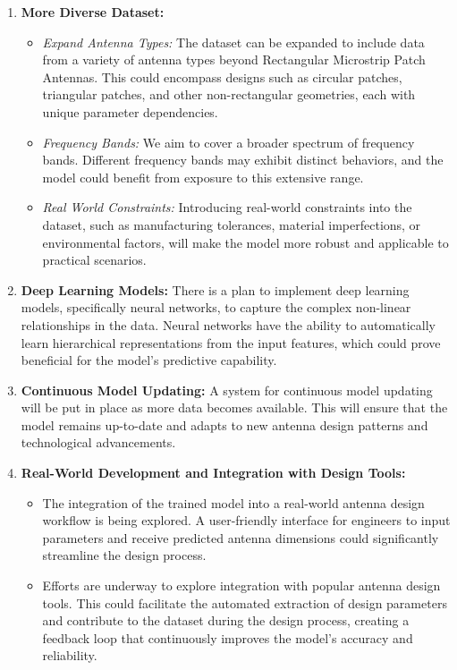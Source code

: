 \documentclass[a4paper,12pt]{report}
\begin{document}
\begin{enumerate}
    \item \textbf{More Diverse Dataset:}
    \begin{itemize}
        \item \textit{Expand Antenna Types:} The dataset can be expanded to include data from a variety of antenna types beyond Rectangular Microstrip Patch Antennas. This could encompass designs such as circular patches, triangular patches, and other non-rectangular geometries, each with unique parameter dependencies.
        \item \textit{Frequency Bands:} We aim to  cover a broader spectrum of frequency bands. Different frequency bands may exhibit distinct behaviors, and the model could benefit from exposure to this extensive range.
        \item \textit{Real World Constraints:} Introducing real-world constraints into the dataset, such as manufacturing tolerances, material imperfections, or environmental factors, will make the model more robust and applicable to practical scenarios.
    \end{itemize}

    \item \textbf{Deep Learning Models:} There is a plan to implement deep learning models, specifically neural networks, to capture the complex non-linear relationships in the data. Neural networks have the ability to automatically learn hierarchical representations from the input features, which could prove beneficial for the model's predictive capability.

    \item \textbf{Continuous Model Updating:} A system for continuous model updating will be put in place as more data becomes available. This will ensure that the model remains up-to-date and adapts to new antenna design patterns and technological advancements.

    \item \textbf{Real-World Development and Integration with Design Tools:}
    \begin{itemize}
        \item The integration of the trained model into a real-world antenna design workflow is being explored. A user-friendly interface for engineers to input parameters and receive predicted antenna dimensions could significantly streamline the design process.
        \item Efforts are underway to explore integration with popular antenna design tools. This could facilitate the automated extraction of design parameters and contribute to the dataset during the design process, creating a feedback loop that continuously improves the model's accuracy and reliability.
    \end{itemize}
\end{enumerate}
\end{document}
